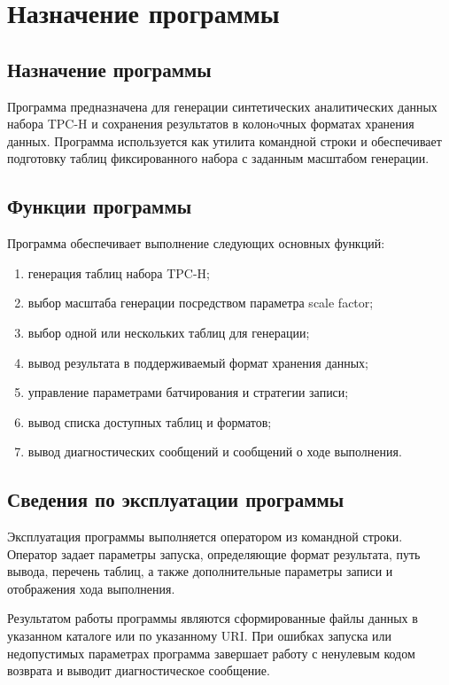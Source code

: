 \section{Назначение программы}

\subsection{Назначение программы}

Программа предназначена для генерации синтетических аналитических данных набора
TPC-H и сохранения результатов в колонoчных форматах хранения данных.
Программа используется как утилита командной строки и обеспечивает подготовку
таблиц фиксированного набора с заданным масштабом генерации.

\subsection{Функции программы}

Программа обеспечивает выполнение следующих основных функций:
\begin{enumerate}
    \item генерация таблиц набора TPC-H;
    \item выбор масштаба генерации посредством параметра scale factor;
    \item выбор одной или нескольких таблиц для генерации;
    \item вывод результата в поддерживаемый формат хранения данных;
    \item управление параметрами батчирования и стратегии записи;
    \item вывод списка доступных таблиц и форматов;
    \item вывод диагностических сообщений и сообщений о ходе выполнения.
\end{enumerate}

\subsection{Сведения по эксплуатации программы}

Эксплуатация программы выполняется оператором из командной строки. Оператор
задает параметры запуска, определяющие формат результата, путь вывода, перечень
таблиц, а также дополнительные параметры записи и отображения хода выполнения.

Результатом работы программы являются сформированные файлы данных в указанном
каталоге или по указанному URI. При ошибках запуска или недопустимых параметрах
программа завершает работу с ненулевым кодом возврата и выводит диагностическое
сообщение.
